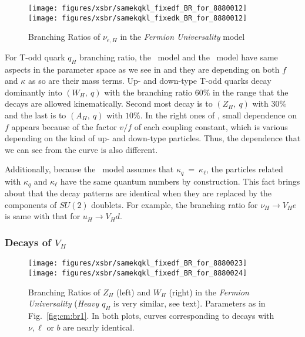 \begin{figure*}
\centering
\texttt{[image: figures/xsbr/samekqkl\_fixedf\_BR\_for\_8880012]} \quad
\texttt{[image: figures/xsbr/samekqkl\_fixedk\_BR\_for\_8880012]} \quad
\caption{Branching Ratios of $\nu_{e,H}$ in the \emph{Fermion Universality} model}
\label{fig:cm:br12}
\end{figure*}
 For T-odd quark $q_H$ branching ratio, the \fu~model and the \lil~model have same aspects in the parameter space as we see in 
and they are depending on both $f$ and $\kappa$ as so are their mass terms.
Up- and down-type T-odd quarks decay dominantly into $(W_H,~q)$ with the branching ratio $60\%$ in the range that the decays are allowed kinematically.
Second most decay is to $(Z_H,~q)$ with $30\%$ and the last is to $(A_H,~q)$ with $10\%$.
In the right ones of , small dependence on $f$ appears because of the factor $v/f$ of each coupling constant, which is various 
depending on the kind of up- and down-type particles. Thus, the dependence that we can see from the curve is also different.

Additionally, because the \fu~model assumes that $\kappa_q~=~\kappa_\ell$, 
the particles related with $\kappa_q$ and $\kappa_\ell$ have the same quantum numbers by construction.
This fact brings about that the decay patterns are identical when they are replaced by the components of $SU(2)$ doublets.
For example, the branching ratio for $\nu_H \to V_H e$ is same with that for $u_H \to V_H d$.

\subsubsection*{Decays of $V_H$} 
\begin{figure*}
\centering
\texttt{[image: figures/xsbr/samekqkl\_fixedf\_BR\_for\_8880023]} \quad
\texttt{[image: figures/xsbr/samekqkl\_fixedf\_BR\_for\_8880024]}
\caption{Branching Ratios of $Z_H$ (left) and $W_H$ (right)  in the \emph{Fermion Universality} (\emph{Heavy $q_H$} is very similar, see text). 
Parameters as in Fig.~\ref{fig:cm:br1}. In both plots, curves corresponding to decays with $\nu, \ell$ or $b$ are nearly identical.}
\label{fig:cm:br2324}
\end{figure*}

